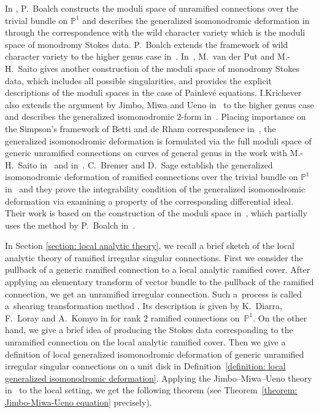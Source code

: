 \documentclass[pdftex]{sigma}
\numberwithin{equation}{section}
\begin{document}
In \cite{Boalch-1}, P.~Boalch constructs the moduli space of unramified connections
over the trivial bundle on $\mathbb{P}^1$ and describes the generalized isomonodromic deformation
in~\cite{Jimbo-Miwa-Ueno} through the correspondence with the wild character variety
which is the moduli space of monodromy Stokes data.
P.~Boalch extends the framework of wild character variety to the higher genus case
in~\cite{Boalch-2}.
In~\cite{van-der-Put-Saito},
M.~van der Put and M.-H.~Saito gives
another construction of the moduli space of monodromy Stokes data,
which includes all possible singularities, and
provides the explicit descriptions of the moduli spaces in the case of Painlev\'e equations.
I.Krichever also extends the argument by Jimbo, Miwa and Ueno in~\cite{Jimbo-Miwa-Ueno}
to the higher genus case and describes the generalized isomonodromic $2$-form in~\cite{Krichever}.
Placing importance on the Simpson's framework of Betti and de Rham correspondence
in~\cite{Simpson-2},
the generalized isomonodromic deformation is formulated
via the full moduli space of generic unramified connections on curves of general genus
in the work with M.-H.~Saito in~\cite{Inaba-Saito} and in~\cite{Inaba-3}.
C.~Bremer and D.~Sage establish the generalized isomonodromic deformation
of ramified connections over the trivial bundle on $\mathbb{P}^1$ in~\cite{Bremer-Sage-2}
and they prove the integrability condition of the generalized isomonodromic deformation
via examining a property of the corresponding differential ideal.
Their work is based on the construction of the moduli space in~\cite{Bremer-Sage-1},
which partially uses the method by P.~Boalch in~\cite{Boalch-1}.

In Section \ref{section: local analytic theory}, we recall a brief sketch of
the local analytic theory of ramified irregular singular connections.
First we consider the pullback of a generic ramified connection to a local analytic
ramified cover.
After applying an elementary transform of vector bundle to
the pullback of the ramified connection,
we get an unramified irregular connection.
Such a~process is called a~shearing transformation method
\cite[Section 19.3]{Wasow}.
Its description is given by K.~Diarra, F.~Loray and A.~Komyo
in \cite{Diarra-Loray,Komyo-2}
for rank $2$ ramified connections on~$\mathbb{P}^1$.
On the other hand,
we give a brief idea of producing the Stokes data corresponding to the unramified
connection on the local analytic ramified cover.
Then we give a definition of local generalized isomonodromic deformation
of generic unramified irregular singular connections on a unit disk
in Definition~\ref{definition: local generalized isomonodromic deformation}.
Applying the Jimbo--Miwa--Ueno theory in~\cite{Jimbo-Miwa-Ueno}
to the local setting, we get the following theorem
(see Theorem~\ref{theorem: Jimbo-Miwa-Ueno equation} precisely).
\end{document}
